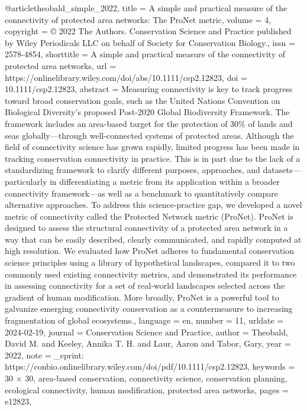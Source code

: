 {{{{@article{theobald_simple_2022,
	title = {A simple and practical measure of the connectivity of protected area networks: {The} {ProNet} metric},
	volume = {4},
	copyright = {© 2022 The Authors. Conservation Science and Practice published by Wiley Periodicals LLC on behalf of Society for Conservation Biology.},
	issn = {2578-4854},
	shorttitle = {A simple and practical measure of the connectivity of protected area networks},
	url = {https://onlinelibrary.wiley.com/doi/abs/10.1111/csp2.12823},
	doi = {10.1111/csp2.12823},
	abstract = {Measuring connectivity is key to track progress toward broad conservation goals, such as the United Nations Convention on Biological Diversity's proposed Post-2020 Global Biodiversity Framework. The framework includes an area-based target for the protection of 30\% of lands and seas globally—through well-connected systems of protected areas. Although the field of connectivity science has grown rapidly, limited progress has been made in tracking conservation connectivity in practice. This is in part due to the lack of a standardizing framework to clarify different purposes, approaches, and datasets—particularly in differentiating a metric from its application within a broader connectivity framework—as well as a benchmark to quantitatively compare alternative approaches. To address this science-practice gap, we developed a novel metric of connectivity called the Protected Network metric (ProNet). ProNet is designed to assess the structural connectivity of a protected area network in a way that can be easily described, clearly communicated, and rapidly computed at high resolution. We evaluated how ProNet adheres to fundamental conservation science principles using a library of hypothetical landscapes, compared it to two commonly used existing connectivity metrics, and demonstrated its performance in assessing connectivity for a set of real-world landscapes selected across the gradient of human modification. More broadly, ProNet is a powerful tool to galvanize emerging connectivity conservation as a countermeasure to increasing fragmentation of global ecosystems.},
	language = {en},
	number = {11},
	urldate = {2024-02-19},
	journal = {Conservation Science and Practice},
	author = {Theobald, David M. and Keeley, Annika T. H. and Laur, Aaron and Tabor, Gary},
	year = {2022},
	note = {\_eprint: https://conbio.onlinelibrary.wiley.com/doi/pdf/10.1111/csp2.12823},
	keywords = {30 × 30, area-based conservation, connectivity science, conservation planning, ecological connectivity, human modification, protected area networks},
	pages = {e12823},
}

}}}}
